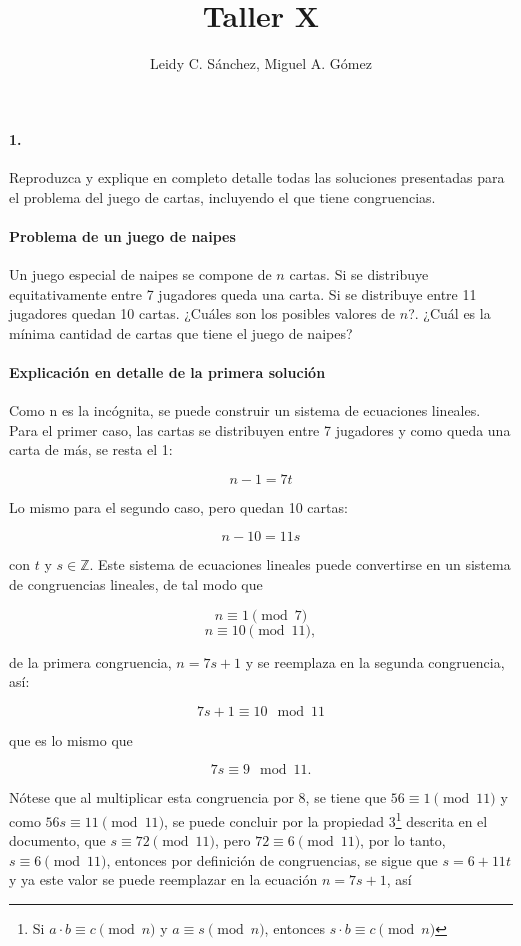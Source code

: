 \documentclass{article}
\begin{document}
	\title{Taller X}
	\author{Leidy C. Sánchez, Miguel A. Gómez}
	\maketitle
	
	\paragraph{1.} Reproduzca y explique en completo detalle todas las soluciones presentadas para el problema del juego de cartas, incluyendo el que tiene congruencias.
	
	\paragraph{Problema de un juego de naipes} Un juego especial de naipes se compone de $n$ cartas. Si se distribuye equitativamente entre 7 jugadores queda una carta. Si se distribuye entre 11 jugadores quedan 10 cartas.
	¿Cuáles son los posibles valores de $n$?. ¿Cuál es la mínima cantidad de cartas que tiene el juego de naipes? 
	
	\paragraph{Explicación en detalle de la primera solución} Como n es la incógnita, se puede construir un sistema de ecuaciones lineales. Para el primer caso, las cartas se distribuyen entre 7 jugadores y como queda una carta de más, se resta el 1:
	
	$$n-1=7t$$
	
	Lo mismo para el segundo caso, pero quedan 10 cartas:
	
	$$n-10=11s$$
	
	con $t$ y $s \in \mathbb{Z}$. Este sistema de ecuaciones lineales puede convertirse en un sistema de congruencias lineales, de tal modo que
	
	$$n\equiv 1 \pmod{7}$$
	$$n\equiv 10 \pmod{11},$$
	
	de la primera congruencia, $n=7s+1$ y se reemplaza en la segunda congruencia, así:
	
	$$7s+1\equiv 10 \mod{11}$$ 
	
	que es lo mismo que
	
	$$7s\equiv9\mod{11}.$$
	
	Nótese que al multiplicar esta congruencia por 8, se tiene que $56\equiv 1 \pmod{11}$ y como $56s\equiv11\pmod{11}$, se puede concluir por la propiedad 3\footnote{Si $a \cdot b \equiv c \pmod{n}$ y $a \equiv s \pmod{n}$, entonces $s \cdot b \equiv c \pmod{n}$ } descrita en el documento, que $s\equiv72\pmod{11}$, pero $72\equiv6\pmod{11}$, por lo tanto, $s\equiv6\pmod{11}$, entonces por definición de congruencias, se sigue que $s=6+11t$ y ya este valor se puede reemplazar en la ecuación $n=7s+1$, así
	
\end{document}
